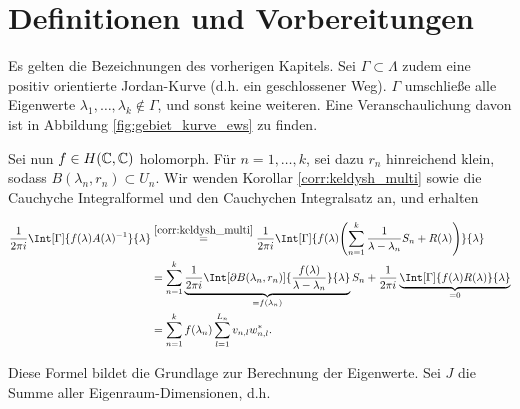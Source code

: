 \section{Definitionen und Vorbereitungen}

Es gelten die Bezeichnungen des vorherigen Kapitels.
Sei $\Gamma \subset \Lambda$ zudem eine positiv orientierte Jordan-Kurve (d.h. ein geschlossener Weg).
$\Gamma$ umschließe alle Eigenwerte $\lambda_1, \dots, \lambda_k \not \in \Gamma$, und sonst keine weiteren.
Eine Veranschaulichung davon ist in Abbildung \ref{fig:gebiet_kurve_ews} zu finden.



Sei nun $f \in H(\mathbb{C}, \mathbb{C})$ holomorph.
Für $n = 1, \dots, k$, sei dazu $r_n$ hinreichend klein, sodass $B(\lambda_n, r_n) \subset U_n$.
Wir wenden Korollar \ref{corr:keldysh_multi} sowie die Cauchyche Integralformel und den Cauchychen Integralsatz an, und erhalten

\begin{align} \label{eq:cauchysche_integral_formel_satz}
    \begin{split}
        \frac{1}{2 \pi i}
        \Int[\Gamma]
        {
            f(\lambda) A(\lambda)^{-1}
        }{\lambda}
        & \stackrel
        {
            \ref{corr:keldysh_multi}
        }{=}
        \frac{1}{2 \pi i}
        \Int[\Gamma]
        {
            f(\lambda)
            \pbraces
            {
                \sum_{n=1}^k
                    \frac{1}{\lambda - \lambda_n} S_n
                    +
                    R(\lambda)
            }
        }{\lambda} \\
        & =
        \sum_{n=1}^k
            \underbrace
            {
                \frac{1}{2 \pi i}
                \Int[\partial B(\lambda_n, r_n)]
                {
                    \frac{f(\lambda)}{\lambda - \lambda_n}
                }{\lambda}
            }_{=f(\lambda_n)}
            S_n
        +
        \frac{1}{2 \pi i}
        \underbrace
        {
            \Int[\Gamma]
            {
                f(\lambda) R(\lambda)
            }{\lambda}
        }_{=0} \\
        & =
        \sum_{n=1}^k
            f(\lambda_n)
            \sum_{l=1}^{L_n}
                v_{n, l} w_{n, l}^\ast.
    \end{split}
\end{align}

Diese Formel bildet die Grundlage zur Berechnung der Eigenwerte.
Sei $J$ die Summe aller Eigenraum-Dimensionen, d.h.

